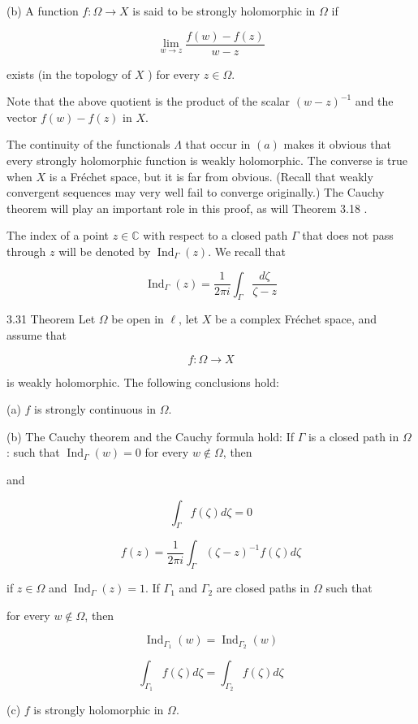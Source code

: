 \documentclass[10pt]{article}
\begin{document}
(b) A function $f: \Omega \rightarrow X$ is said to be strongly holomorphic in $\Omega$ if

$$
\lim _{w \rightarrow z} \frac{f(w)-f(z)}{w-z}
$$

exists (in the topology of $X$ ) for every $z \in \Omega$.

Note that the above quotient is the product of the scalar $(w-z)^{-1}$ and the vector $f(w)-f(z)$ in $X$.

The continuity of the functionals $\Lambda$ that occur in $(a)$ makes it obvious that every strongly holomorphic function is weakly holomorphic. The converse is true when $X$ is a Fréchet space, but it is far from obvious. (Recall that weakly convergent sequences may very well fail to converge originally.) The Cauchy theorem will play an important role in this proof, as will Theorem 3.18 .

The index of a point $z \in \mathbb{C}$ with respect to a closed path $\Gamma$ that does not pass through $z$ will be denoted by $\operatorname{Ind}_{\Gamma}(z)$. We recall that

$$
\operatorname{Ind}_{\Gamma}(z)=\frac{1}{2 \pi i} \int_{\Gamma} \frac{d \zeta}{\zeta-z}
$$

3.31 Theorem Let $\Omega$ be open in $\ell$, let $X$ be a complex Fréchet space, and assume
that

$$
f: \Omega \rightarrow X
$$

is weakly holomorphic. The following conclusions hold:

(a) $f$ is strongly continuous in $\Omega$.

(b) The Cauchy theorem and the Cauchy formula hold: If $\Gamma$ is a closed path in $\Omega$ : such that $\operatorname{Ind}_{\Gamma}(w)=0$ for every $w \notin \Omega$, then

and

$$
\int_{\Gamma} f(\zeta) d \zeta=0
$$

$$
f(z)=\frac{1}{2 \pi i} \int_{\Gamma}(\zeta-z)^{-1} f(\zeta) d \zeta
$$

if $z \in \Omega$ and $\operatorname{Ind}_{\Gamma}(z)=1$. If $\Gamma_{1}$ and $\Gamma_{2}$ are closed paths in $\Omega$ such that

for every $w \notin \Omega$, then

$$
\operatorname{Ind}_{\Gamma_{1}}(w)=\operatorname{Ind}_{\Gamma_{2}}(w)
$$

$$
\int_{\Gamma_{1}} f(\zeta) d \zeta=\int_{\Gamma_{2}} f(\zeta) d \zeta
$$

(c) $f$ is strongly holomorphic in $\Omega$.
\end{document}
